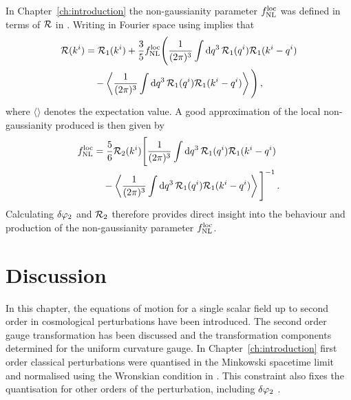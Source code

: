 In Chapter~\ref{ch:introduction} the non-gaussianity parameter $f_{\mathrm{NL}}^\mathrm{loc}$ was defined
in terms of $\mathcal{R}$ in . Writing  in
Fourier space using  implies that
% 
\begin{align}
 \R(\kvi) &= \R_1(\kvi)
  + \frac{3}{5}\fnlloc \Bigg( \frac{1}{(2\pi)^3}\int \d q^3\, \R_1(\qvi)
\R_1(\kvi-\qvi) \\ \nonumber
% 
  &\quad- \left\langle \frac{1}{(2\pi)^3} \int \d q^3\, \R_1(\qvi)
\R_1(\kvi-\qvi) \right\rangle \Bigg) \,,
\end{align}
% 
where $\langle \rangle$ denotes the expectation value.
A good approximation of the local non-gaussianity produced is then given by
% 
\begin{align}
 \label{eq:fnlloc-perts}
\fnlloc &= \frac{5}{6} \R_2(\kvi) \Bigg[ \frac{1}{(2\pi)^3}\int \d q^3\, \R_1(\qvi)
\R_1(\kvi-\qvi) \\ \nonumber
% 
  &\quad- \left\langle \frac{1}{(2\pi)^3} \int \d q^3\, \R_1(\qvi)
\R_1(\kvi-\qvi) \right\rangle \Bigg]^{-1} \,.
\end{align}
% 
Calculating $\delta\varphi_{2}$ and $\mathcal{R}_2$ therefore provides direct insight into the behaviour
and
production of the non-gaussianity parameter $f_{\mathrm{NL}}^\mathrm{loc}$. 

% 
% 
% 
% 
\section{Discussion}
\label{sec:disc-perts}

In this chapter, the equations of motion for a single scalar
field
up to second order in cosmological perturbations have been introduced. The second
order gauge
transformation has been discussed and the transformation components determined for
the uniform curvature gauge.
% 
In Chapter~\ref{ch:introduction} first order classical perturbations were quantised
in the Minkowski spacetime limit and normalised using the Wronskian condition in
. This constraint also fixes the quantisation for other
orders of the perturbation, including $\delta\varphi_{2}$ \cite{Seery:2008qj}. 

